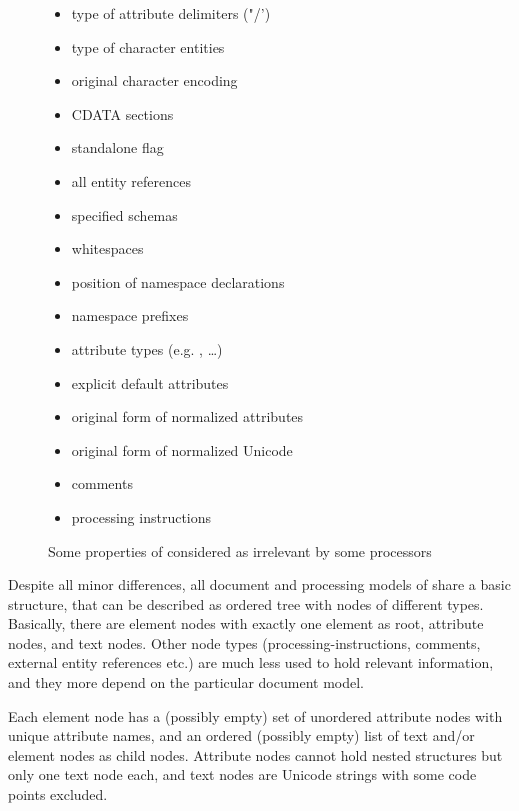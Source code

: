 \begin{figure}
\begin{multicols}{2}
\begin{itemize}
 \item type of attribute delimiters ("/')
 \item type of character entities
 \item original character encoding
 \item CDATA sections
 \item standalone flag
 \item all entity references
 \item specified schemas
 \item whitespaces
 \item position of namespace declarations
 \item namespace prefixes
 \item attribute types (e.g. , \ldots)
 \item explicit default attributes
 \item original form of normalized attributes
 \item original form of normalized Unicode
 \item comments
 \item processing instructions
\end{itemize}
\end{multicols}
\caption{Some properties of  considered as irrelevant by some processors}
\label{fig:irrelevantxmlparts}
\end{figure}

Despite all minor differences, all document and processing models of 
share a basic structure, that can be described as ordered tree with nodes of 
different types. Basically, there are element nodes with
exactly one element as root, attribute nodes, and text nodes. Other node
types (processing-instructions, comments, external entity references etc.) are 
much less used to hold relevant information, and they more depend on the 
particular document model. 

Each element node has a (possibly empty) set of unordered attribute
nodes with unique attribute names, and an ordered (possibly empty) list
of text and/or element nodes as child nodes. Attribute nodes cannot hold
nested structures but only one text node each, and text nodes are Unicode
strings with some code points excluded.

